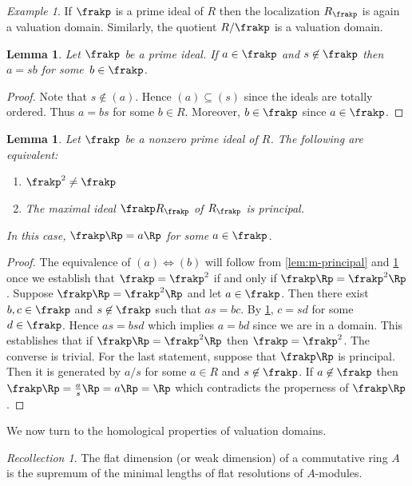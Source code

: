 \documentclass{amsart}
\numberwithin{equation}{section}%
\newtheorem{Lem}[equation]{Lemma}
\theoremstyle{remark}
\newtheorem{Exa}[equation]{Example}
\newtheorem{Rec}[equation]{Recollection}
\newcounter{enum-resume-hack}
\begin{document}
\begin{Exa}\label{exa:Rp-vd}
	If $\frakp$ is a prime ideal of $R$ then the localization $R_\frakp$ is again a valuation domain. Similarly, the quotient $R/\frakp$ is a valuation domain.
\end{Exa}

\begin{Lem}\label{lem:dodgy-lemma}
	Let $\frakp$ be a prime ideal. If $a \in \frakp$ and $s \not\in\frakp$ then $a=sb$ for some~${b \in \frakp}$.
\end{Lem}

\begin{proof}
	Note that $s\not\in(a)$. Hence $(a) \subseteq (s)$ since the ideals are totally ordered. Thus $a = bs$ for some $b \in R$. Moreover, $b\in \frakp$ since $a \in \frakp$.
\end{proof}

\begin{Lem}\label{lem:p-idempotent-principal}
	Let $\frakp$ be a nonzero prime ideal of $R$. The following are equivalent:
	\begin{enumerate}
		\item $\frakp^2 \neq \frakp$
		\item The maximal ideal $\frakp R_{\frakp}$ of $R_{\frakp}$ is principal.
	\end{enumerate}
	In this case, $\frakp\Rp = a\Rp$ for some $a \in \frakp$.
\end{Lem}

\begin{proof}
	The equivalence of $(a) \Leftrightarrow (b)$ will follow from \cref{lem:m-principal} and \cref{exa:Rp-vd} once we establish that $\frakp=\frakp^2$ if and only if $\frakp\Rp = \frakp^2\Rp$. Suppose $\frakp\Rp = \frakp^2\Rp$ and let $a \in \frakp$. Then there exist $b,c \in \frakp$ and $s \not\in\frakp$ such that $as=bc$. By \cref{lem:dodgy-lemma}, $c=sd$ for some $d \in \frakp$. Hence $as=bsd$ which implies $a=bd$ since we are in a domain. This establishes that if $\frakp\Rp=\frakp^2\Rp$ then $\frakp = \frakp^2$. The converse is trivial. For the last statement, suppose that $\frakp\Rp$ is principal. Then it is generated by $a/s$ for some $a \in R$ and $s \not\in \frakp$. If $a \not \in\frakp$ then $\frakp\Rp = \frac{a}{s}\Rp=a\Rp=\Rp$ which contradicts the properness of $\frakp\Rp$.
\end{proof}

We now turn to the homological properties of valuation domains.

\begin{Rec} 
	The flat dimension (or weak dimension) of a commutative ring $A$ is the supremum of the minimal lengths of flat resolutions of $A$-modules.
\end{Rec}
\end{document}
